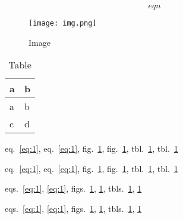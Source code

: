 \begin{equation}eqn\label{eq:1}\end{equation}

\begin{figure}
\hypertarget{fig:1}{%
\centering
\texttt{[image: img.png]}
\caption{Image}\label{fig:1}
}
\end{figure}

\hypertarget{tbl:1}{}
\begin{longtable}[]{@{}ll@{}}
\caption{\label{tbl:1}Table}\tabularnewline
\toprule
a & b\tabularnewline
\midrule
\endfirsthead
\toprule
a & b\tabularnewline
\midrule
\endhead
c & d\tabularnewline
\bottomrule
\end{longtable}

eq.~\ref{eq:1}, eq.~\ref{eq:1}, fig.~\ref{fig:1}, fig.~\ref{fig:1},
tbl.~\ref{tbl:1}, tbl.~\ref{tbl:1}

eq.~\ref{eq:1}, eq.~\ref{eq:1}, fig.~\ref{fig:1}, fig.~\ref{fig:1},
tbl.~\ref{tbl:1}, tbl.~\ref{tbl:1}

eqs.~\ref{eq:1}, \ref{eq:1}, figs.~\ref{fig:1}, \ref{fig:1},
tbls.~\ref{tbl:1}, \ref{tbl:1}

eqs.~\ref{eq:1}, \ref{eq:1}, figs.~\ref{fig:1}, \ref{fig:1},
tbls.~\ref{tbl:1}, \ref{tbl:1}
